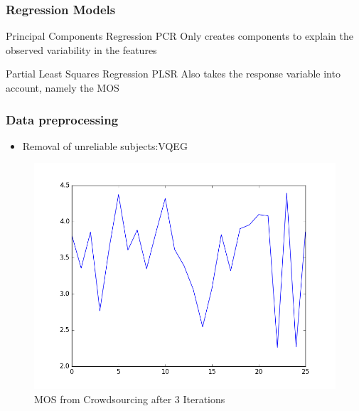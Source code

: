 \documentclass{beamer}
\begin{document}
\begin{frame}
\frametitle{Regression Models}
	\begin{block}{Principal Components Regression PCR}
		 Only creates components to explain the observed variability in the features
	\end{block}
	\begin{block}{Partial Least Squares Regression PLSR}
		 Also takes the response variable into account, namely the MOS 
	\end{block}
\end{frame} 

\begin{frame}
	\frametitle{Data preprocessing}
	\begin{itemize}
		\item Removal of unreliable subjects:VQEG
	\end{itemize}
	\begin{figure}
		\includegraphics[scale=0.35]{images/crowdsourced_MOS.png} 
		\caption{MOS from Crowdsourcing after 3 Iterations}
	\end{figure}
\end{frame} 
\end{document}
